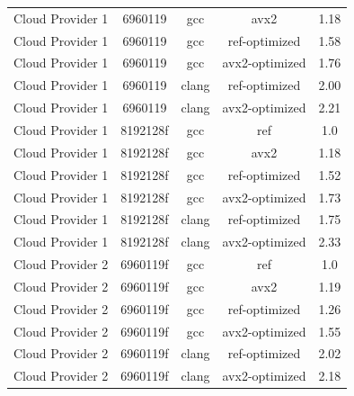 \begin{table}
\begin{tabularx}{\linewidth}{X c c c c}
            Cloud Provider 1 &              6960119 &                  gcc &                 avx2 &                1.18\\
            Cloud Provider 1 &              6960119 &                  gcc &        ref-optimized &                1.58\\
            Cloud Provider 1 &              6960119 &                  gcc &       avx2-optimized &                1.76\\
            Cloud Provider 1 &              6960119 &                clang &        ref-optimized &                2.00\\
            Cloud Provider 1 &              6960119 &                clang &       avx2-optimized &                2.21\\
            Cloud Provider 1 &             8192128f &                  gcc &                  ref &                  1.0\\
            Cloud Provider 1 &             8192128f &                  gcc &                 avx2 &                1.18\\
            Cloud Provider 1 &             8192128f &                  gcc &        ref-optimized &                1.52\\
            Cloud Provider 1 &             8192128f &                  gcc &       avx2-optimized &                1.73\\
            Cloud Provider 1 &             8192128f &                clang &        ref-optimized &                1.75\\
            Cloud Provider 1 &             8192128f &                clang &       avx2-optimized &                2.33\\
            Cloud Provider 2 &             6960119f &                  gcc &                  ref &                  1.0\\
            Cloud Provider 2 &             6960119f &                  gcc &                 avx2 &                1.19\\
            Cloud Provider 2 &             6960119f &                  gcc &        ref-optimized &                1.26\\
            Cloud Provider 2 &             6960119f &                  gcc &       avx2-optimized &                1.55\\
            Cloud Provider 2 &             6960119f &                clang &        ref-optimized &                2.02\\
            Cloud Provider 2 &             6960119f &                clang &       avx2-optimized &                2.18\\

\end{tabularx}
\end{table}
